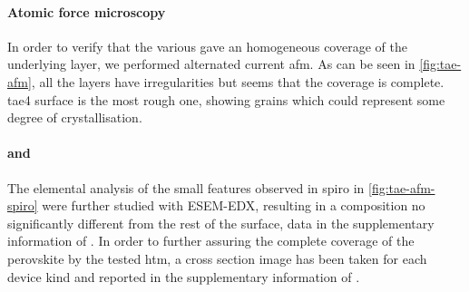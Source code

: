 	\paragraph{Atomic force microscopy}
	In order to verify that the various  gave an homogeneous coverage of the underlying layer, we performed alternated current \gls{afm}.
	As can be seen in \cref{fig:tae-afm}, all the layers have irregularities but seems that the coverage is complete.
	\Gls{tae4} surface is the most rough one, showing grains which could represent some degree of crystallisation.


	\begin{figure}
	\end{figure}

	\paragraph{ and }
	The elemental analysis of the small features observed in \gls{spiro} in \cref{fig:tae-afm-spiro} were further studied with ESEM-EDX, resulting in a composition no significantly different from the rest of the surface, data in the supplementary information of \cite{Gelmetti2019}.
	In order to further assuring the complete coverage of the perovskite by the tested \gls{htm}, a cross section image has been taken for each device kind and reported in the supplementary information of \cite{Gelmetti2019}.

